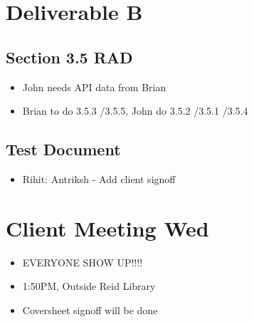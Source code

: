 
\date{Mon 12 Sept, 2011}


\maketitle


\section{Deliverable B}
\subsection{Section 3.5 RAD}
\begin{itemize}
 \item John needs API data from Brian
 \item Brian to do 3.5.3 \slash 3.5.5, John do 3.5.2 \slash 3.5.1 \slash 3.5.4
 
\end{itemize}
\subsection{Test Document}
\begin{itemize}
 \item Rihit: Antriksh - Add client signoff
\end{itemize}

\section{Client Meeting Wed}
\begin{itemize}
\item EVERYONE SHOW UP!!!!
\item 1:50PM, Outside Reid Library
\item Coversheet signoff will be done
\end{itemize}




